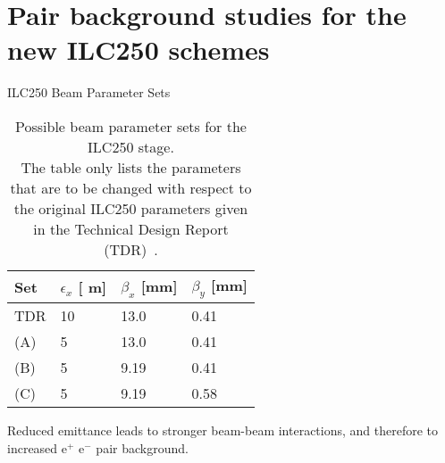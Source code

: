 \documentclass[xcolor={dvipsnames}]{beamer}
\newcommand{\electron}{e$^-$\xspace}
\newcommand{\positron}{e$^+$\xspace}
\newcommand{\murm}{%
  \ifmmode
    \mathchoice
        {\hbox{\normalsize\textmu}}
        {\hbox{\normalsize\textmu}}
        {\hbox{\scriptsize\textmu}}
        {\hbox{\tiny\textmu}}%
  \else
    \textmu
  \fi
}
\begin{document}
\section{Pair background studies for the new ILC250 schemes}

\begin{frame}{ILC250 Beam Parameter Sets}
 \begin{table}
\caption{Possible beam parameter sets for the ILC250 stage.\\{\small The table only lists the parameters that are to be changed with respect to the original ILC250 parameters given in the Technical Design Report (TDR)~\cite[p. 11]{TDR1}.}}
\label{tab:Parameters}
\centering
\begin{tabularx}{0.55\textwidth}{llll}
\hline\hline
\textbf{Set}  & \textbf{$\epsilon_x$ [\murm m]} & \textbf{$\beta_x$ [mm]} & \textbf{$\beta_y$ [mm]}\\
\hline
\cline{1-4}
\hline
 TDR & 10 & 13.0 & 0.41\\
 (A) & 5 & 13.0 & 0.41\\
 (B) & 5 & 9.19 & 0.41\\
 (C) & 5 & 9.19 & 0.58\\
\hline\hline
\end{tabularx}
\end{table}
\alert{Reduced emittance leads to stronger beam-beam interactions, and therefore to increased \positron \electron pair background.}
\end{frame}
\end{document}
